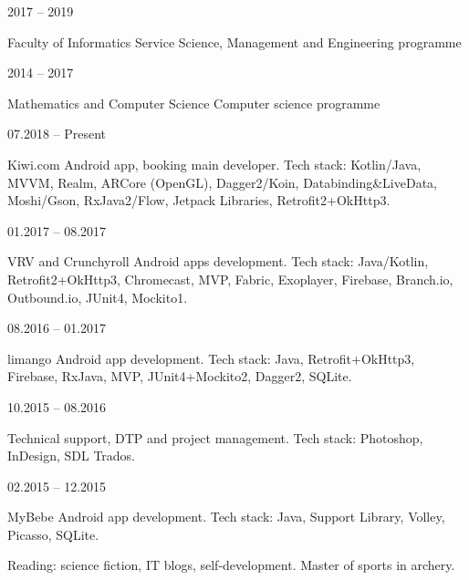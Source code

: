 \documentclass[12pt, a4paper]{article}
\begin{document}
\begin{minipage}[t]{0.6\textwidth}
    
     \hfill 2017 – 2019
    
    Faculty of Informatics \newline
    Service Science, Management and Engineering programme
    
     \hfill 2014 – 2017
    
    Mathematics and Computer Science \newline
    Computer science programme \newline
    
    
     \hfill 07.2018 – Present
    
    Kiwi.com Android app, booking main developer. \newline
    Tech stack: Kotlin/Java, MVVM, Realm, ARCore (OpenGL), \newline
    Dagger2/Koin, Databinding\&LiveData, Moshi/Gson, \newline
    RxJava2/Flow, Jetpack Libraries, Retrofit2+OkHttp3.
    
     \hfill 01.2017 – 08.2017
    
    VRV and Crunchyroll Android apps development.
    Tech stack: Java/Kotlin, Retrofit2+OkHttp3, Chromecast, MVP, Fabric, Exoplayer, Firebase, Branch.io, Outbound.io, JUnit4, Mockito1.
   
     \hfill 08.2016 – 01.2017
    
    limango Android app development. \newline
    Tech stack: Java, Retrofit+OkHttp3, Firebase, RxJava, MVP, \newline
    JUnit4+Mockito2, Dagger2, SQLite.
    
     \hfill 10.2015 – 08.2016
    
    Technical support, DTP and project management. \newline
    Tech stack: Photoshop, InDesign, SDL Trados.
    
     \hfill 02.2015 – 12.2015
    
    MyBebe Android app development. \newline
    Tech stack: Java, Support Library, Volley, Picasso, SQLite.

    
    Reading: science fiction, IT blogs, self-development. \newline
    Master of sports in archery.
\end{minipage}
\end{document}
